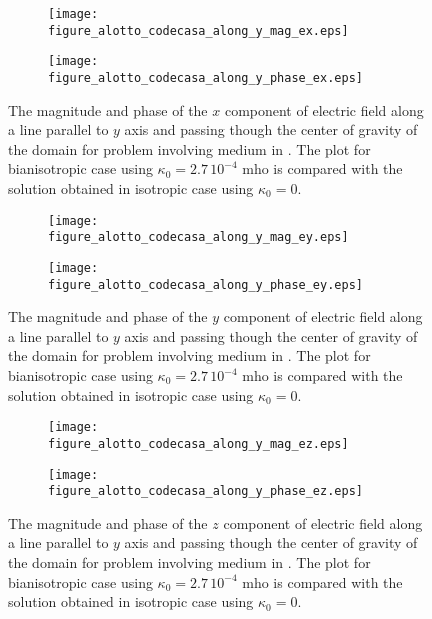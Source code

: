 \begin{figure}
\centering
\begin{subfigure}[b]{0.49\textwidth}
\texttt{[image: figure\_alotto\_codecasa\_along\_y\_mag\_ex.eps]}
\end{subfigure}
%
\begin{subfigure}[b]{0.49\textwidth}
\centering
\texttt{[image: figure\_alotto\_codecasa\_along\_y\_phase\_ex.eps]}
\end{subfigure}
\caption{The magnitude and phase of the $x$ component of electric field along a line parallel to $y$ axis 
and passing though the center of gravity of the domain for problem involving 
medium in \cite{alottocodecasa}. 
The plot for bianisotropic case  using $\kappa_0 = 2.7\,10^{-4}$ mho is compared with 
the solution obtained in isotropic case using $\kappa_0 = 0$.}
\label{fi:alotto_codecasa_yaxis_ex}
\end{figure}

\begin{figure}
\centering
\begin{subfigure}[b]{0.49\textwidth}
\texttt{[image: figure\_alotto\_codecasa\_along\_y\_mag\_ey.eps]}
\end{subfigure}
%
\begin{subfigure}[b]{0.49\textwidth}
\centering
\texttt{[image: figure\_alotto\_codecasa\_along\_y\_phase\_ey.eps]}
\end{subfigure}
\caption{The magnitude and phase of the $y$ component of electric field along a line parallel to $y$ axis 
and passing though the center of gravity of the domain for problem involving 
medium in \cite{alottocodecasa}. 
The plot for bianisotropic case  using $\kappa_0 = 2.7\,10^{-4}$ mho is compared with 
the solution obtained in isotropic case using $\kappa_0 = 0$.}
\label{fi:alotto_codecasa_yaxis_ey}
\end{figure}

\begin{figure}
\centering
\begin{subfigure}[b]{0.49\textwidth}
\texttt{[image: figure\_alotto\_codecasa\_along\_y\_mag\_ez.eps]}
\end{subfigure}
%
\begin{subfigure}[b]{0.49\textwidth}
\centering
\texttt{[image: figure\_alotto\_codecasa\_along\_y\_phase\_ez.eps]}
\end{subfigure}
\caption{The magnitude and phase of the $z$ component of electric field along a line parallel to $y$ axis 
and passing though the center of gravity of the domain for problem involving 
medium in \cite{alottocodecasa}. 
The plot for bianisotropic case  using $\kappa_0 = 2.7\,10^{-4}$ mho is compared with 
the solution obtained in isotropic case using $\kappa_0 = 0$.}
\label{fi:alotto_codecasa_yaxis_ez}
\end{figure}

